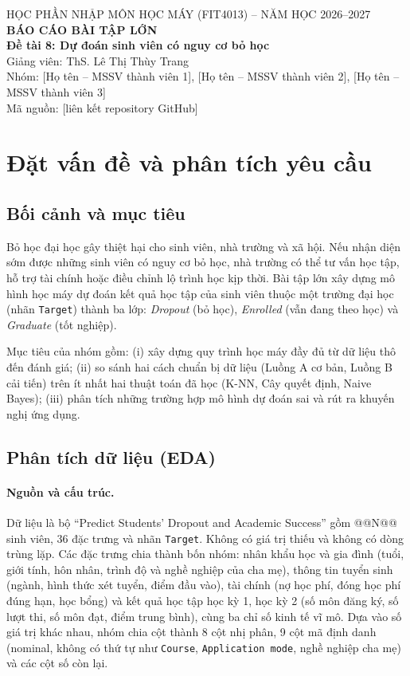 \documentclass[12pt,a4paper]{article}
\begin{document}
\begin{center}
{\large HỌC PHẦN NHẬP MÔN HỌC MÁY (FIT4013) -- NĂM HỌC 2026--2027}\\[6pt]
{\LARGE\bfseries BÁO CÁO BÀI TẬP LỚN}\\[8pt]
{\Large\bfseries Đề tài 8: Dự đoán sinh viên có nguy cơ bỏ học}\\[10pt]
Giảng viên: ThS. Lê Thị Thùy Trang\\[4pt]
Nhóm: [Họ tên -- MSSV thành viên 1], [Họ tên -- MSSV thành viên 2], [Họ tên -- MSSV thành viên 3]\\
Mã nguồn: [liên kết repository GitHub]
\end{center}

\tableofcontents
\newpage

\section{Đặt vấn đề và phân tích yêu cầu}
\subsection{Bối cảnh và mục tiêu}
Bỏ học đại học gây thiệt hại cho sinh viên, nhà trường và xã hội. Nếu nhận diện sớm được những sinh viên có nguy cơ bỏ học,
nhà trường có thể tư vấn học tập, hỗ trợ tài chính hoặc điều chỉnh lộ trình học kịp thời. Bài tập lớn xây dựng mô hình học máy
dự đoán kết quả học tập của sinh viên thuộc một trường đại học (nhãn \texttt{Target}) thành ba lớp: \textit{Dropout} (bỏ học),
\textit{Enrolled} (vẫn đang theo học) và \textit{Graduate} (tốt nghiệp).

Mục tiêu của nhóm gồm: (i) xây dựng quy trình học máy đầy đủ từ dữ liệu thô đến đánh giá; (ii) so sánh hai cách chuẩn bị dữ liệu
(Luồng A cơ bản, Luồng B cải tiến) trên ít nhất hai thuật toán đã học (K-NN, Cây quyết định, Naive Bayes); (iii) phân tích những
trường hợp mô hình dự đoán sai và rút ra khuyến nghị ứng dụng.

\subsection{Phân tích dữ liệu (EDA)}
\paragraph{Nguồn và cấu trúc.}
Dữ liệu là bộ ``Predict Students' Dropout and Academic Success'' \cite{realinho2022} gồm @@N@@ sinh viên, 36 đặc trưng và nhãn
\texttt{Target}. Không có giá trị thiếu và không có dòng trùng lặp. Các đặc trưng chia thành bốn nhóm: nhân khẩu học và gia đình
(tuổi, giới tính, hôn nhân, trình độ và nghề nghiệp của cha mẹ), thông tin tuyển sinh (ngành, hình thức xét tuyển, điểm đầu vào),
tài chính (nợ học phí, đóng học phí đúng hạn, học bổng) và kết quả học tập học kỳ 1, học kỳ 2 (số môn đăng ký, số lượt thi,
số môn đạt, điểm trung bình), cùng ba chỉ số kinh tế vĩ mô. Dựa vào số giá trị khác nhau, nhóm chia cột thành 8 cột nhị phân,
9 cột mã định danh (nominal, không có thứ tự như \texttt{Course}, \texttt{Application mode}, nghề nghiệp cha mẹ) và các cột số còn lại.
\end{document}
